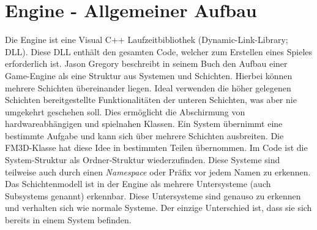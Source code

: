 \section{Engine - Allgemeiner Aufbau}

Die Engine ist eine Visual C++ Laufzeitbibliothek (Dynamic-Link-Library; DLL). Diese DLL enthält den gesamten Code, welcher zum Erstellen eines Spieles erforderlich ist. Jason Gregory beschreibt in seinem Buch den Aufbau einer Game-Engine als eine Struktur aus Systemen und Schichten. 
Hierbei können mehrere Schichten übereinander liegen. Ideal verwenden die höher gelegenen Schichten bereitgestellte Funktionalitäten der unteren Schichten, was aber nie umgekehrt geschehen soll. Dies ermöglicht die Abschirmung von hardwareabhängigen und spielnahen Klassen. Ein System übernimmt eine bestimmte Aufgabe und kann sich über mehrere Schichten ausbreiten. \cite{gea}
Die FM3D-Klasse hat diese Idee in bestimmten Teilen übernommen. Im Code ist die System-Struktur als Ordner-Struktur wiederzufinden. Diese Systeme sind teilweise auch durch einen \textit{Namespace} oder Präfix vor jedem Namen zu erkennen. Das Schichtenmodell ist in der Engine als mehrere Untersysteme (auch Subsystems genannt) erkennbar. Diese Untersysteme sind genauso zu erkennen und verhalten sich wie normale Systeme. Der einzige Unterschied ist, dass sie sich bereits in einem System befinden.